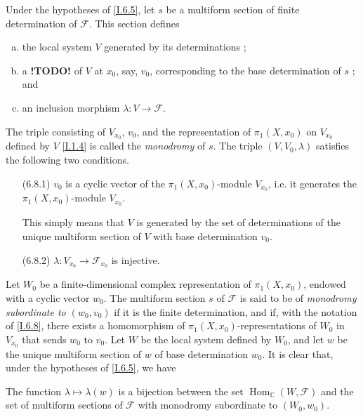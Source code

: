 \documentclass{report}
\theoremstyle{plain}
\newenvironment{proposition}[1]
    {\renewcommand\theinnercustomproposition{#1}\innercustomproposition}
    {\endinnercustomproposition}
\theoremstyle{definition}
\newenvironment{env}[1]
    {\renewcommand\theinnercustomenv{#1}\innercustomenv}
    {\endinnercustomenv}
\newcommand{\sh}[1]{{\mathscr{#1}}}
\newcommand{\CC}{\mathbb{C}}
\DeclareMathOperator{\Hom}{Hom}
\newcommand{\todo}{\textbf{ !TODO! }}
\newcommand{\oldpage}[1]{\marginpar{\footnotesize$\Big\vert$ \textit{p.~#1}}}
\begin{document}
\begin{env}{6.8}
\label{I.6.8}
  Under the hypotheses of \cref{I.6.5}, let $s$ be a multiform section of finite determination of $\sh{F}$.
  This section defines
\oldpage{39}
  \begin{enumerate}[a)]
    \item the local system $V$ generated by its determinations ;
    \item a \todo of $V$ at $x_0$, say, $v_0$, corresponding to the base determination of $s$ ; and
    \item an inclusion morphism $\lambda\colon V\to\sh{F}$.
  \end{enumerate}

  The triple consisting of $V_{x_0}$, $v_0$, and the representation of $\pi_1(X,x_0)$ on $V_{x_0}$ defined by $V$ \cref{I.1.4} is called the \emph{monodromy} of $s$.
  The triple $(V,V_0,\lambda)$ satisfies the following two conditions.
  \begin{enumerate}
    \item[(6.8.1)]\label{I.6.8.1}
      $v_0$ is a cyclic vector of the $\pi_1(X,x_0)$-module $V_{x_0}$, i.e. it generates the $\pi_1(X,x_0)$-module $V_{x_0}$.

      This simply means that $V$ is generated by the set of determinations of the unique multiform section of $V$ with base determination $v_0$.
    \item[(6.8.2)]\label{I.6.8.2}
      $\lambda\colon V_{x_0}\to\sh{F}_{x_0}$ is injective.
  \end{enumerate}
\end{env}

\begin{env}{6.9}
\label{I.6.9}
  Let $W_0$ be a finite-dimensional complex representation of $\pi_1(X,x_0)$, endowed with a cyclic vector $w_0$.
  The multiform section $s$ of $\sh{F}$ is said to be of \emph{monodromy subordinate to $(w_0,v_0)$} if it is the finite determination, and if, with the notation of \cref{I.6.8}, there exists a homomorphism of $\pi_1(X,x_0)$-representations of $W_0$ in $V_{x_0}$ that sends $w_0$ to $v_0$.
  Let $W$ be the local system defined by $W_0$, and let $w$ be the unique multiform section of $w$ of base determination $w_0$.
  It is clear that, under the hypotheses of \cref{I.6.5}, we have
\end{env}

\begin{proposition}{6.10}
\label{I.6.10}
  The function $\lambda\mapsto\lambda(w)$ is a bijection between the set $\Hom_\CC(W,\sh{F})$ and the set of multiform sections of $\sh{F}$ with monodromy subordinate to $(W_0,w_0)$.
\end{proposition}
\end{document}
